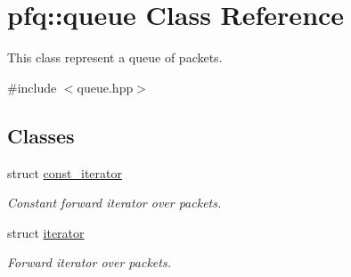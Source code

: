 \hypertarget{classpfq_1_1queue}{\section{pfq\+:\+:queue Class Reference}
\label{classpfq_1_1queue}
}


This class represent a queue of packets.  




{\ttfamily \#include $<$queue.\+hpp$>$}

\subsection*{Classes}
\begin{DoxyCompactItemize}
\item 
struct \hyperlink{structpfq_1_1queue_1_1const__iterator}{const\+\_\+iterator}
\begin{DoxyCompactList}\small\item\em Constant forward iterator over packets. \end{DoxyCompactList}\item 
struct \hyperlink{structpfq_1_1queue_1_1iterator}{iterator}
\begin{DoxyCompactList}\small\item\em Forward iterator over packets. \end{DoxyCompactList}\end{DoxyCompactItemize}
